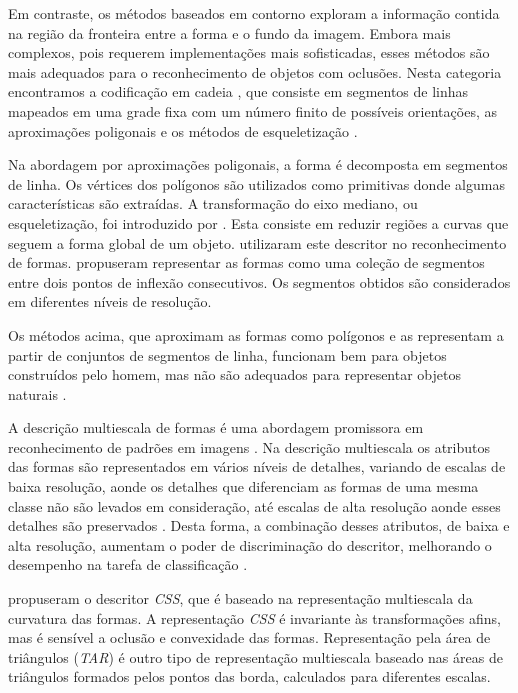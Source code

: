 Em contraste, os métodos baseados em contorno exploram a informação contida na região da fronteira entre a forma e o fundo da imagem. Embora mais complexos, pois requerem implementações mais sofisticadas, esses métodos são mais adequados para o reconhecimento de objetos com oclusões. Nesta categoria encontramos a codificação em cadeia \cite[p~337]{Costa:2009}, que consiste em segmentos de linhas mapeados em uma grade fixa com um número finito de possíveis orientações, as aproximações poligonais \cite[p~340--351]{Costa:2009} e os métodos de esqueletização \cite[p~394--400]{Costa:2009}. 

Na abordagem por aproximações poligonais, a forma é decomposta em segmentos de linha. Os vértices dos polígonos são utilizados como primitivas donde algumas características são extraídas. A transformação do eixo mediano, ou esqueletização, foi introduzido por . Esta consiste em reduzir regiões a curvas que seguem a forma global de um objeto.  utilizaram este descritor no reconhecimento de formas.  propuseram representar as formas como uma coleção de segmentos entre dois pontos de inflexão consecutivos. Os segmentos obtidos são considerados em diferentes níveis de resolução. 

Os métodos acima, que aproximam as formas como polígonos e as representam a partir de conjuntos de segmentos de linha, funcionam bem para objetos construídos pelo homem, mas não são adequados para representar objetos naturais \cite{Zhang:2004}.

A descrição multiescala de formas é uma abordagem promissora em reconhecimento de padrões em imagens \cite{Direkoglu:2011}. Na descrição multiescala os atributos das formas são representados em vários níveis de detalhes, variando de escalas de baixa resolução, aonde os detalhes que diferenciam as formas de uma mesma classe não são levados em consideração, até escalas de alta resolução aonde esses detalhes são preservados \cite{Ullman:1996}. Desta forma, a combinação desses atributos, de baixa e alta resolução, aumentam o poder de discriminação do descritor, melhorando o desempenho na tarefa de classificação \cite{Direkoglu:2011}.

 propuseram o descritor \textit{CSS}, que é baseado na representação multiescala da curvatura das formas. A representação \textit{CSS} é invariante às transformações afins, mas é sensível a oclusão e convexidade das formas. Representação pela área de triângulos (\textit{TAR}) \cite{Alajlan20117} é outro tipo de representação multiescala baseado nas áreas de triângulos formados pelos pontos das borda, calculados para diferentes escalas. 

